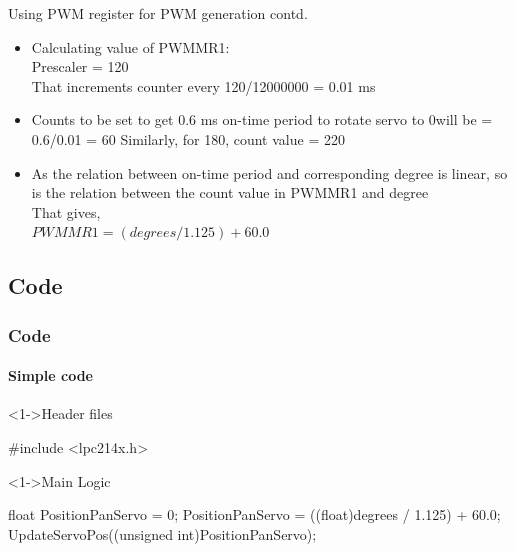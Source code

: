 \documentclass[table,10pt,red]{beamer}	%
\begin{document}
\begin{frame}{Using PWM register for PWM generation contd.}
	\begin{itemize}
		\item
		Calculating value of PWMMR1:\\
		Prescaler = 120\\
		\pause
		That increments counter every 120/12000000 = 0.01 ms\\
		\pause
		\item
		Counts to be set to get 0.6 ms on-time period to rotate servo to 0\degree will be = 0.6/0.01 = 60
		\pause
		Similarly, for 180\degree, count value = 220\\
		\pause
		\item
		As the relation between on-time period and corresponding degree is linear, so is the relation between the count value in PWMMR1 and degree\\
		\pause
		That gives,\\
		$	PWMMR1 = (degrees / 1.125) + 60.0    $
		
		
	\end{itemize}
\end{frame}

\subsection{Code}

\begin{frame}[fragile]
	\frametitle{Code} \pause
	\framesubtitle{Simple code}
	\begin{block}<1->{Header files}	\pause
		\begin{semiverbatim}
			\scriptsize{
			#include  <lpc214x.h>
			}
		\end{semiverbatim}
	\end{block} \pause
	
	\begin{block}<1->{Main Logic}	\pause
		\begin{semiverbatim}
			{
			float PositionPanServo = 0;
			PositionPanServo = ((float)degrees / 1.125) + 60.0;
			UpdateServoPos((unsigned int)PositionPanServo);
			}		
		\end{semiverbatim}
	\end{block}
\end{frame}
\end{document}
